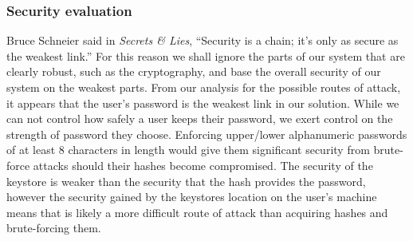 \documentclass[12pt, titlepage]{article}
\begin{document}
\subsubsection*{Security evaluation}
Bruce Schneier said in \textit{Secrets \& Lies}, ``Security is a chain; it's only as secure as the weakest link.''\cite{schneierSecretsLies} For this reason we shall ignore the parts of our system that are clearly robust, such as the cryptography, and base the overall security of our system on the weakest parts.
\newline \indent From our analysis for the possible routes of attack, it appears that the user's password is the weakest link in our solution. While we can not control how safely a user keeps their password, we exert control on the strength of password they choose. Enforcing upper/lower alphanumeric passwords of at least 8 characters in length would give them significant security from brute-force attacks should their hashes become compromised.
\newline \indent The security of the keystore is weaker than the security that the hash provides the password, however the security gained by the keystores location on the user's machine means that is likely a more difficult route of attack than acquiring hashes and brute-forcing them.

\newpage
\end{document}
